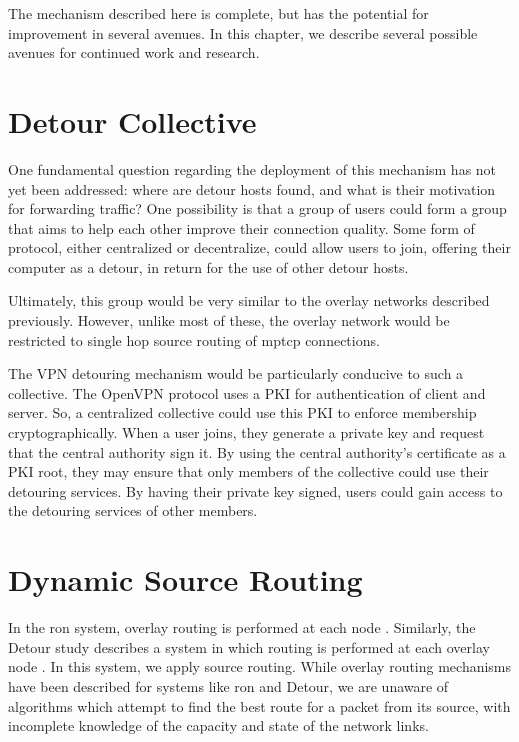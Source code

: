 \documentclass{cwru}
\begin{document}
The mechanism described here is complete, but has the potential for improvement
in several avenues. In this chapter, we describe several possible avenues for
continued work and research.

\section{Detour Collective}

One fundamental question regarding the deployment of this mechanism has not yet
been addressed: where are detour hosts found, and what is their motivation for
forwarding traffic? One possibility is that a group of users could form a group
that aims to help each other improve their connection quality. Some form of
protocol, either centralized or decentralize, could allow users to join,
offering their computer as a detour, in return for the use of other detour
hosts.

Ultimately, this group would be very similar to the overlay networks described
previously. However, unlike most of these, the overlay network would be
restricted to single hop source routing of \ac{mptcp} connections.

The VPN detouring mechanism would be particularly conducive to such a
collective. The OpenVPN protocol uses a PKI for authentication of client and
server. So, a centralized collective could use this PKI to enforce membership
cryptographically. When a user joins, they generate a private key and request
that the central authority sign it. By using the central authority's certificate
as a PKI root, they may ensure that only members of the collective could use
their detouring services. By having their private key signed, users could gain
access to the detouring services of other members.

\section{Dynamic Source Routing}

In the \ac{ron} system, overlay routing is performed at each node \cite{ron}.
Similarly, the Detour study describes a system in which routing is performed at
each overlay node \cite{detour}. In this system, we apply source routing. While
overlay routing mechanisms have been described for systems like \ac{ron} and
Detour, we are unaware of algorithms which attempt to find the best route for a
packet from its source, with incomplete knowledge of the capacity and state of
the network links.
\end{document}
